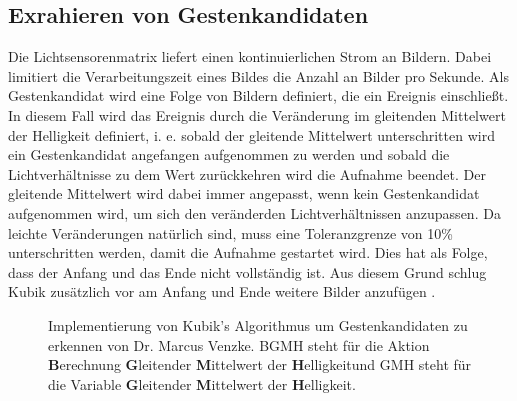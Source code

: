 \subsection{Exrahieren von Gestenkandidaten}
\label{sec:gesture_extraction}
Die Lichtsensorenmatrix liefert einen kontinuierlichen Strom an Bildern. Dabei limitiert die Verarbeitungszeit eines Bildes die Anzahl an Bilder pro Sekunde. Als Gestenkandidat wird eine Folge von Bildern definiert, die
ein Ereignis einschließt. In diesem Fall wird das Ereignis durch die Veränderung im gleitenden Mittelwert der Helligkeit definiert, i. e. sobald der gleitende Mittelwert unterschritten wird ein Gestenkandidat
angefangen aufgenommen zu werden und sobald die Lichtverhältnisse zu dem Wert zurückkehren wird die Aufnahme beendet. Der gleitende Mittelwert wird dabei immer angepasst, wenn kein Gestenkandidat aufgenommen wird, um
sich den veränderden Lichtverhältnissen anzupassen. Da leichte Veränderungen natürlich sind, muss eine Toleranzgrenze von 10\% unterschritten werden, damit die Aufnahme gestartet wird. Dies hat als Folge, dass der Anfang
und das Ende nicht vollständig ist. Aus diesem Grund schlug Kubik zusätzlich vor am Anfang und Ende weitere Bilder anzufügen \cite{kubikThesis}.
\newline
\newline
\begin{figure}
    \usetikzlibrary{arrows,automata,positioning}
    \centering
    \caption{Implementierung von Kubik's Algorithmus um Gestenkandidaten zu erkennen von Dr. Marcus Venzke. BGMH steht für die Aktion \glqq \textbf{B}erechnung \textbf{G}leitender \textbf{M}ittelwert der \textbf{H}elligkeit\grqq und GMH steht für die Variable \glqq \textbf{G}leitender \textbf{M}ittelwert der \textbf{H}elligkeit\grqq.}
    \label{fig:venzkeAlgoImpl}
\end{figure}
